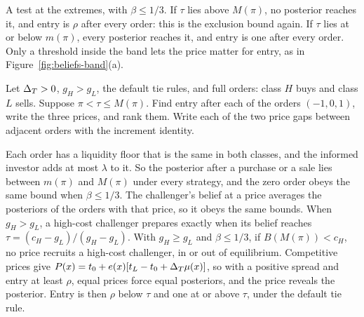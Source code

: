 A test at the extremes, with \(\beta\le1/3\). If \(\tau\) lies above \(M(\pi)\), no posterior reaches it, and entry is \(\rho\) after every order: this is the exclusion bound again. If \(\tau\) lies at or below \(m(\pi)\), every posterior reaches it, and entry is one after every order. Only a threshold inside the band lets the price matter for entry, as in Figure~\ref{fig:beliefs-band}(a).

\begin{checkyourself}\label{q:beliefs-entry}
Let \(\Delta_T>0\), \(g_H>g_L\), the default tie rules, and full orders: class \(H\) buys and class \(L\) sells. Suppose \(\pi<\tau\le M(\pi)\). Find entry after each of the orders \((-1,0,1)\), write the three prices, and rank them. Write each of the two price gaps between adjacent orders with the increment identity.
\end{checkyourself}

\begin{chaptersummary}
Each order has a liquidity floor that is the same in both classes, and the informed investor adds at most \(\lambda\) to it. So the posterior after a purchase or a sale lies between \(m(\pi)\) and \(M(\pi)\) under every strategy, and the zero order obeys the same bound when \(\beta\le1/3\). The challenger's belief at a price averages the posteriors of the orders with that price, so it obeys the same bounds. When \(g_H>g_L\), a high-cost challenger prepares exactly when its belief reaches \(\tau=(c_H-g_L)/(g_H-g_L)\). With \(g_H\ge g_L\) and \(\beta\le1/3\), if \(B(M(\pi))<c_H\), no price recruits a high-cost challenger, in or out of equilibrium. Competitive prices give \(P(x)=t_0+e(x)[t_L-t_0+\Delta_T\mu(x)]\), so with a positive spread and entry at least \(\rho\), equal prices force equal posteriors, and the price reveals the posterior. Entry is then \(\rho\) below \(\tau\) and one at or above \(\tau\), under the default tie rule.
\end{chaptersummary}

\answersection

